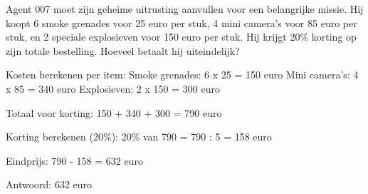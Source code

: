 \begin{opgave}
Agent 007 moet zijn geheime uitrusting aanvullen voor een belangrijke missie. 
Hij koopt 6 smoke grenades voor 25 euro per stuk, 4 mini camera's voor 85 euro 
per stuk, en 2 speciale explosieven voor 150 euro per stuk. Hij krijgt 20\% 
korting op zijn totale bestelling. Hoeveel betaalt hij uiteindelijk?
\end{opgave}

\begin{oplossing}
Kosten berekenen per item:
Smoke grenades: 6 x 25 = 150 euro
Mini camera's: 4 x 85 = 340 euro
Explosieven: 2 x 150 = 300 euro

Totaal voor korting:
150 + 340 + 300 = 790 euro

Korting berekenen (20\%):
20\% van 790 = 790 : 5 = 158 euro

Eindprijs:
790 - 158 = 632 euro

Antwoord: 632 euro
\end{oplossing}